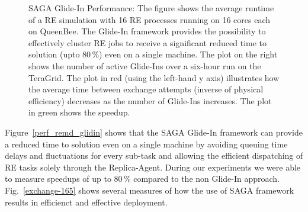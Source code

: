 \documentclass{llncs}
\begin{document}
\begin{figure}[htbp]
  \caption{SAGA Glide-In Performance: The figure shows the average
    runtime of a RE simulation with 16 RE processes running on 16
    cores each on QueenBee.  The Glide-In framework provides the
    possibility to effectively cluster RE jobs to receive a
    significant reduced time to solution (upto
    80\,\%) even on a single machine.
    The plot on the right shows the number of active Glide-Ins over a
    six-hour run on the TeraGrid.  The plot in red (using the
    left-hand y axis) illustrates how the average time between
    exchange attempts (inverse of physical efficiency) decreases as
    the number of Glide-Ins increases. The plot in green shows the
    speedup.}
\end{figure}

Figure~\ref{perf_remd_glidin} shows that the SAGA Glide-In framework
can provide a reduced time to solution even on a single machine by
avoiding queuing time delays and fluctuations for every sub-task and
allowing the efficient dispatching of RE tasks solely through the
Replica-Agent. During our experiments we were able to measure speedups
of up to 80\,\% compared to the non Glide-In
approach. Fig.~\ref{exchange-165} shows several measures of how the
use of SAGA framework results in efficienct and effective deployment.
\end{document}
